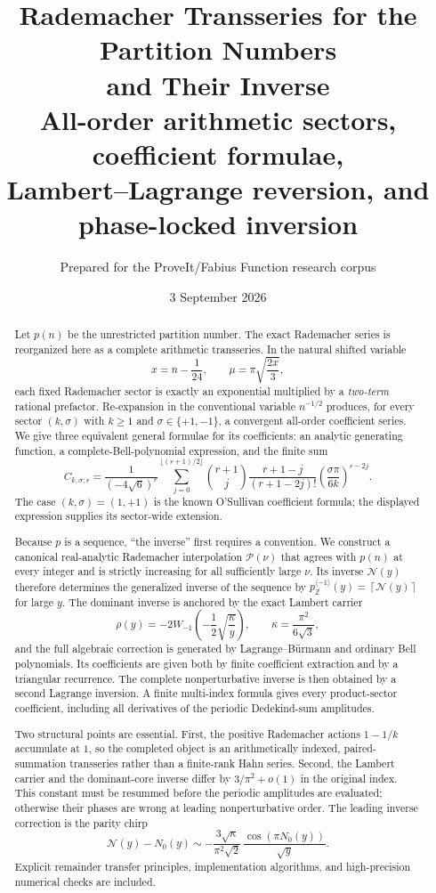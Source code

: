 \documentclass[11pt,a4paper]{article}
\title{\bfseries Rademacher Transseries for the Partition Numbers\\[2mm]
       and Their Inverse\\[2mm]
       \large All-order arithmetic sectors, coefficient formulae,\\
       Lambert--Lagrange reversion, and phase-locked inversion}
\author{Prepared for the ProveIt/Fabius Function research corpus}
\date{3 September 2026}
\numberwithin{equation}{section}
\theoremstyle{definition}
\theoremstyle{remark}
\newcommand{\Z}{\mathbb Z}
\newcommand{\Pcal}{\mathcal P}
\newcommand{\Ncal}{\mathcal N}
\newcommand{\ceil}[1]{\left\lceil#1\right\rceil}
\begin{document}
\maketitle

\begin{abstract}
Let $p(n)$ be the unrestricted partition number.  The exact Rademacher series is
reorganized here as a complete arithmetic transseries.  In the natural shifted
variable
\[
 x=n-\frac1{24},\qquad \mu=\pi\sqrt{\frac{2x}{3}},
\]
each fixed Rademacher sector is exactly an exponential multiplied by a
\emph{two-term} rational prefactor.  Re-expansion in the conventional variable
$n^{-1/2}$ produces, for every sector $(k,\sigma)$ with $k\geq1$ and
$\sigma\in\{+1,-1\}$, a convergent all-order coefficient series.  We give three
equivalent general formulae for its coefficients: an analytic generating
function, a complete-Bell-polynomial expression, and the finite sum
\[
 C_{k,\sigma;r}=\frac1{(-4\sqrt6)^r}
 \sum_{j=0}^{\lfloor(r+1)/2\rfloor}
 \binom{r+1}{j}\frac{r+1-j}{(r+1-2j)!}
 \left(\frac{\sigma\pi}{6k}\right)^{r-2j}.
\]
The case $(k,\sigma)=(1,+1)$ is the known O'Sullivan coefficient formula;
the displayed expression supplies its sector-wide extension.

Because $p$ is a sequence, ``the inverse'' first requires a convention.  We
construct a canonical real-analytic Rademacher interpolation $\Pcal(\nu)$ that
agrees with $p(n)$ at every integer and is strictly increasing for all
sufficiently large $\nu$.  Its inverse $\Ncal(y)$ therefore determines the
generalized inverse of the sequence by
$p_{\Z}^{\langle-1\rangle}(y)=\ceil{\Ncal(y)}$ for large $y$.
The dominant inverse is anchored by the exact Lambert carrier
\[
 \rho(y)=-2W_{-1}\!\left(-\frac12\sqrt{\frac{\kappa}{y}}\right),
 \qquad \kappa=\frac{\pi^2}{6\sqrt3},
\]
and the full algebraic correction is generated by Lagrange--B\"urmann and
ordinary Bell polynomials.  Its coefficients are given both by finite
coefficient extraction and by a triangular recurrence.  The complete
nonperturbative inverse is then obtained by a second Lagrange inversion.  A
finite multi-index formula gives every product-sector coefficient, including
all derivatives of the periodic Dedekind-sum amplitudes.

Two structural points are essential.  First, the positive Rademacher actions
$1-1/k$ accumulate at $1$, so the completed object is an arithmetically indexed,
paired-summation transseries rather than a finite-rank Hahn series.  Second, the
Lambert carrier and the dominant-core inverse differ by
$3/\pi^2+o(1)$ in the original index.  This constant must be resummed before the
periodic amplitudes are evaluated; otherwise their phases are wrong at leading
nonperturbative order.  The leading inverse correction is the parity chirp
\[
 \Ncal(y)-N_0(y)\sim
 -\frac{3\sqrt\kappa}{\pi^2\sqrt2}\,
 \frac{\cos(\pi N_0(y))}{\sqrt y}.
\]
Explicit remainder transfer principles, implementation algorithms, and
high-precision numerical checks are included.
\end{abstract}
\end{document}
